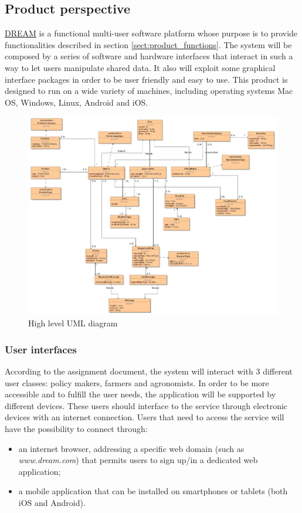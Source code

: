 
\subsection{Product perspective}
\hyperref[tab:acronymsTable]{DREAM} is a functional multi-user software platform whose purpose is to provide functionalities described in section \ref{sect:product_functions}. The system will be composed by a series of software and hardware interfaces that interact in such a way to let users manipulate shared data. It also will exploit some graphical interface packages in order to be user friendly and easy to use.
This product is designed to run on a wide variety of machines, including operating systems Mac OS, Windows, Linux, Android and iOS. 

\begin{figure}[H]
	\centering
    \includegraphics[page=1, width=\textwidth]{Images/uml_draft.JPG}
	\caption{\label{fig:uml_class_diagram}High level UML diagram}
\end{figure}

\subsubsection{User interfaces} %
\label{sect:user_interfaces}
According to the assignment document, the system will interact with 3 different user classes: policy makers, farmers and agronomists. In order to be more accessible and to fulfill the user needs, the application will be supported by different devices. These users should interface to the service through electronic devices with an internet connection. Users that need to access the service will have the possibility to connect through:
\begin{itemize}
    \item an internet browser, addressing a specific web domain (such as \textit{www.dream.com}) that permits users to sign up/in a dedicated web application;
    \item a mobile application that can be installed on smartphones or tablets (both iOS and Android).
\end{itemize}


